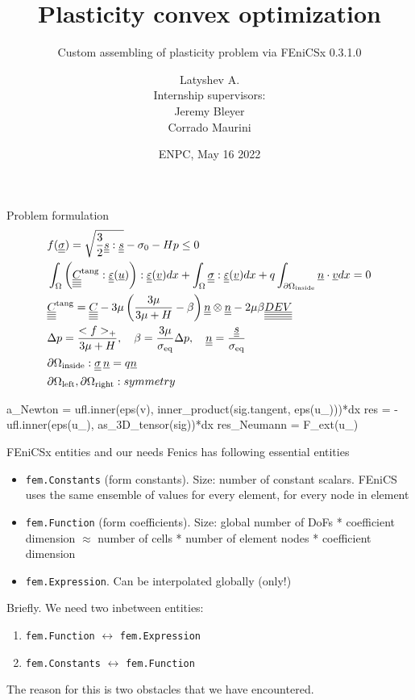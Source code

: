 \documentclass[9pt]{beamer}
\title{Plasticity convex optimization}
\subtitle{Custom assembling of plasticity problem via FEniCSx 0.3.1.0}
\author[Latyshev A.]{Latyshev A. \\ [10mm]{\small Internship supervisors: \\ Jeremy Bleyer \\ Corrado Maurini}  }
\institute[Laboratoire Navier]{Laboratoire Navier}
\date{ENPC, May 16 2022}
\begin{document}
\frame{\titlepage}

\begin{frame}[fragile]{Problem formulation}
  \begin{align}
    & f(\underline{\underline{\sigma}}) = \sqrt{\frac{3}{2} \underline{\underline{s}} : \underline{\underline{s}}} - \sigma_0 - H p \leq 0 \\
    & \int_\Omega \left( \underline{\underline{\underline{\underline{C}}}}^\text{tang} : \underline{\underline{\varepsilon}}(\underline{u})  \right) : \underline{\underline{\varepsilon}}(\underline{v}) dx + \int_\Omega \underline{\underline{\sigma}} : \underline{\underline{\varepsilon}}(\underline{v}) dx + q\int_{\partial\Omega_{\text{inside}}}  \underline{n} \cdot \underline{v} dx = 0 \\
    & \underline{\underline{\underline{\underline{C}}}}^\text{tang} = \underline{\underline{\underline{\underline{C}}}} - 3\mu \left( \frac{3\mu}{3\mu + H} -\beta \right) \underline{\underline{n}} \otimes \underline{\underline{n}} - 2\mu\beta \underline{\underline{\underline{\underline{DEV}}}} \\
    & \Delta p = \frac{<f>_+}{3\mu + H}, \quad \beta = \frac{3\mu}{\sigma_\text{eq}}\Delta p, \quad \underline{\underline{n}} = \frac{\underline{\underline{s}}}{\sigma_\text{eq}} \\
    & \partial\Omega_\text{inside} : \underline{\underline{\sigma}} \, \underline{n} = q\underline{n} \\
    & \partial\Omega_\text{left}, \partial\Omega_\text{right} : symmetry
  \end{align}

  \begin{pythoncode}
    a_Newton = ufl.inner(eps(v), inner_product(sig.tangent, eps(u_)))*dx
    res = -ufl.inner(eps(u_), as_3D_tensor(sig))*dx 
    res_Neumann = F_ext(u_)
  \end{pythoncode}
\end{frame}

\begin{frame}{FEniCSx entities and our needs}
  Fenics has following essential entities 
  \begin{itemize}
    \item \texttt{fem.Constants} (form constants). Size: number of constant scalars. FEniCS uses the same ensemble of values for every element, for every node in element
    \item \texttt{fem.Function} (form coefficients). Size: global number of DoFs * coefficient dimension $\approx$ number of cells * number of element nodes * coefficient dimension
    \item \texttt{fem.Expression}. Can be interpolated globally (only!)
  \end{itemize}

  Briefly. We need two inbetween entities:
  \begin{enumerate}
    \item \texttt{fem.Function} $\longleftrightarrow$ \texttt{fem.Expression}
    \item \texttt{fem.Constants} $\longleftrightarrow$ \texttt{fem.Function}
  \end{enumerate}
  The reason for this is two obstacles that we have encountered.

\end{frame}
\end{document}
